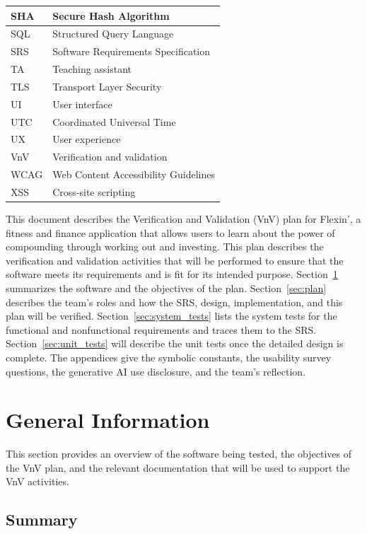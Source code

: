 \documentclass[12pt, titlepage]{article}
\begin{document}
{\begin{xltabular}{\textwidth}{|p{2.8cm}|X|}
SHA & Secure Hash Algorithm \\ \hline
SQL & Structured Query Language \\ \hline
SRS & Software Requirements Specification \\ \hline
TA & Teaching assistant \\ \hline
TLS & Transport Layer Security \\ \hline
UI & User interface \\ \hline
UTC & Coordinated Universal Time \\ \hline
UX & User experience \\ \hline
VnV & Verification and validation \\ \hline
WCAG & Web Content Accessibility Guidelines \\ \hline
XSS & Cross-site scripting \\ \hline
\end{xltabular}
}

\newpage


This document describes the Verification and Validation (VnV) plan for Flexin', a fitness and finance application that allows users to learn about the power of compounding through working out and investing. This plan describes the verification and validation activities that will be performed to ensure that the software meets its requirements and is fit for its intended purpose.
Section~\ref{sec:general} summarizes the software and the objectives
of the plan. Section~\ref{sec:plan} describes the team's roles and how the SRS,
design, implementation, and this plan will be verified.
Section~\ref{sec:system_tests} lists the system tests for the functional and
nonfunctional requirements and traces them to the SRS.
Section~\ref{sec:unit_tests} will describe the unit tests once the detailed
design is complete. The appendices give the symbolic constants, the usability
survey questions, the generative AI use disclosure, and the team's
reflection.

\section{General Information}\label{sec:general}

This section provides an overview of the software being tested, the objectives of the VnV plan, and the relevant documentation that will be used to support the VnV activities.

\subsection{Summary}
\end{document}
